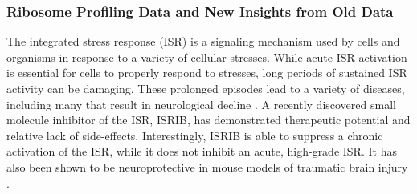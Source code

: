 \documentclass[11pt, a4paper, oneside]{article}
\begin{document}
\subsubsection{Ribosome Profiling Data and New Insights from Old Data}
The integrated stress response (ISR) is a signaling mechanism used by cells and organisms in response to a variety of cellular stresses. While acute ISR activation is essential for cells to properly respond to stresses, long periods of sustained ISR activity can be damaging. These prolonged episodes lead to a variety of diseases, including many that result in neurological decline \cite{isr_disease}. A recently discovered small molecule inhibitor of the ISR, ISRIB, has demonstrated therapeutic potential and relative lack of side-effects. Interestingly, ISRIB is able to suppress a chronic activation of the ISR, while it does not inhibit an acute, high-grade ISR. It has also been shown to be neuroprotective in mouse models of traumatic brain injury \cite{isrib_activation, isrib_structure, isrib_riboseq, isrib_neuroprotective, isrib_neuroprotective2, isrib_neuroprotective3, isrib_neuroprotective4}. \par
\end{document}
